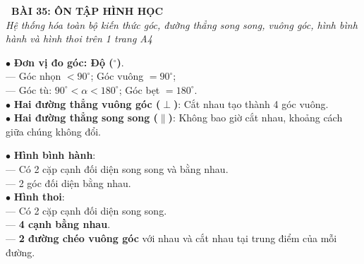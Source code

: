 \documentclass[14pt,a4paper,oneside]{extbook}
\begin{document}
\noindent
\begin{tcolorbox}[
  enhanced,
  colback=teal!8!white,
  colframe=teal!80!black,
  arc=3mm, boxrule=1pt,
  left=3mm, right=3mm, top=2mm, bottom=2mm,
  halign=center
]
  {\Large\bfseries\color{teal!90!black}\faBookmark\ BÀI 35: ÔN TẬP HÌNH HỌC}\\[1.5pt]
  {\footnotesize\itshape\color{black!75} Hệ thống hóa toàn bộ kiến thức góc, đường thẳng song song, vuông góc, hình bình hành và hình thoi trên 1 trang A4}
\end{tcolorbox}

\vspace{2mm}

\noindent
\begin{minipage}[t]{0.49\textwidth}
  \begin{tcolorbox}[
    enhanced,
    title={\footnotesize\bfseries\color{white}\faCompass\ 1. Góc và quan hệ vuông góc, song song},
    colback=blue!2!white,
    colframe=blue!75!black,
    arc=2.5mm, boxrule=0.8pt, top=1.8mm, bottom=1.8mm, left=2mm, right=2mm
  ]
    \footnotesize
    $\bullet$ \textbf{Đơn vị đo góc: Độ ($^\circ$)}.\\
    --- Góc nhọn $< 90^\circ$; Góc vuông $= 90^\circ$;\\
    --- Góc tù: $90^\circ < \alpha < 180^\circ$; Góc bẹt $= 180^\circ$.\\
    $\bullet$ \textbf{Hai đường thẳng vuông góc ($\perp$)}: Cắt nhau tạo thành 4 góc vuông.\\
    $\bullet$ \textbf{Hai đường thẳng song song ($\parallel$)}: Không bao giờ cắt nhau, khoảng cách giữa chúng không đổi.
  \end{tcolorbox}
\end{minipage}%
\hfill
\begin{minipage}[t]{0.49\textwidth}
  \begin{tcolorbox}[
    enhanced,
    title={\footnotesize\bfseries\color{white}\faCube\ 2. Phân loại các tứ giác đặc biệt},
    colback=teal!2!white,
    colframe=teal!75!black,
    arc=2.5mm, boxrule=0.8pt, top=1.8mm, bottom=1.8mm, left=2mm, right=2mm
  ]
    \footnotesize
    $\bullet$ \textbf{Hình bình hành}:\\
    --- Có 2 cặp cạnh đối diện song song và bằng nhau.\\
    --- 2 góc đối diện bằng nhau.\\
    $\bullet$ \textbf{Hình thoi}:\\
    --- Có 2 cặp cạnh đối diện song song.\\
    --- \textbf{4 cạnh bằng nhau}.\\
    --- \textbf{2 đường chéo vuông góc} với nhau và cắt nhau tại trung điểm của mỗi đường.
  \end{tcolorbox}
\end{minipage}
\end{document}
